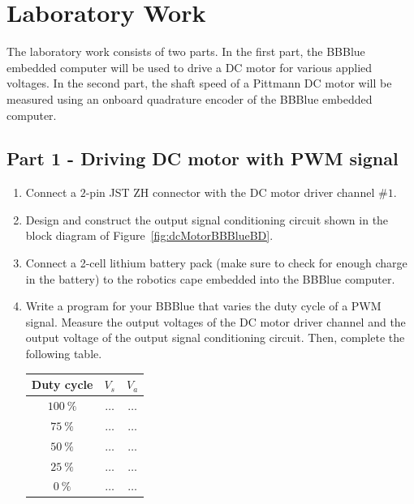 \section{Laboratory Work}
The laboratory work consists of two parts. In the first part, the BBBlue embedded computer will be used to drive a DC motor for various applied voltages. In the second part, the shaft speed of a Pittmann DC motor  will be measured using an onboard quadrature encoder of the BBBlue embedded computer.

\subsection{Part 1 - Driving DC motor with PWM signal}

\begin{enumerate}

  
\item Connect a $2$-pin JST ZH connector with the DC motor driver channel $\#1.$
  
\item Design and construct the output signal conditioning circuit shown in the block diagram of Figure~\ref{fig:dcMotorBBBlueBD}.

\item Connect a 2-cell lithium battery pack (make sure to check for enough charge in the battery) to the robotics cape embedded into the BBBlue computer.     


  
\item Write a program for your BBBlue that varies the duty cycle of a PWM signal. Measure the output voltages of the DC motor driver channel  and the output voltage of the output signal conditioning circuit. Then, complete the following table. ~\label{enum:dutyCycle}%
  
%
  \begin{center}
    \begin{tabular}{c|c|c}
      \toprule
      Duty cycle &  $V_s$ & $V_a$\\
      \toprule
      $100~\%$ & $\ldots$ & $\ldots$\\   %
      $75~\%$ & $\ldots$ & $\ldots$\\   %
      $50~\%$ & $\ldots$ & $\ldots$\\   %
      $25~\%$ & $\ldots$ & $\ldots$\\   %
      $0~\%$ & $\ldots$ & $\ldots$\\   %
      \bottomrule
    \end{tabular}    
  \end{center}
 

\end{enumerate}
